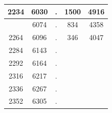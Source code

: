 \documentclass[a4paper, 14pt]{extarticle}%
\begin{document}
\begin{table}[h]
\begin{center}
\begin{tabular}{|cc|c|cc}
\multicolumn{1}{|c|}{2234}                                                           & 6030                         & \cellcolor[HTML]{9698ED}. & \multicolumn{1}{c|}{1500}                                                           & \multicolumn{1}{c|}{4916}                         \\ \hline
\rowcolor[HTML]{9698ED} 
\multicolumn{1}{|c|}{\cellcolor[HTML]{9698ED}2256}                                   & 6074                         & .                         & \multicolumn{1}{c|}{\cellcolor[HTML]{9698ED}834}                                    & \multicolumn{1}{c|}{\cellcolor[HTML]{9698ED}4358} \\ \hline
\multicolumn{1}{|c|}{2264}                                                           & 6096                         & \cellcolor[HTML]{9698ED}. & \multicolumn{1}{c|}{346}                                                            & \multicolumn{1}{c|}{4047}                         \\ \hline
\multicolumn{1}{|c|}{\cellcolor[HTML]{9698ED}2284}                                   & \cellcolor[HTML]{9698ED}6143 & \cellcolor[HTML]{9698ED}. &                                                                                     &                                                   \\ \cline{1-3}
\multicolumn{1}{|c|}{2292}                                                           & 6164                         & \cellcolor[HTML]{9698ED}. &                                                                                     &                                                   \\ \cline{1-3}
\multicolumn{1}{|c|}{\cellcolor[HTML]{9698ED}2316}                                   & \cellcolor[HTML]{9698ED}6217 & \cellcolor[HTML]{9698ED}. &                                                                                     &                                                   \\ \cline{1-3}
\multicolumn{1}{|c|}{2336}                                                           & 6267                         & \cellcolor[HTML]{9698ED}. &                                                                                     &                                             \hspace{2 cm}      \\ \cline{1-3}
\multicolumn{1}{|c|}{\cellcolor[HTML]{9698ED}2352}                                   & \cellcolor[HTML]{9698ED}6305 & \cellcolor[HTML]{9698ED}. &                                                                                     &                                                   \\ \cline{1-3}

\end{tabular}
\end{center}
\end{table}
\end{document}
